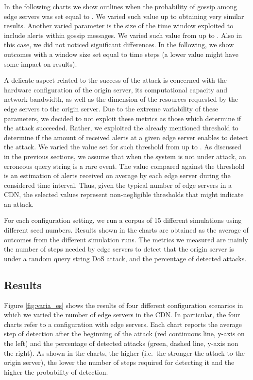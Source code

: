 \documentclass{IEEEtran}
\begin{document}
In the following charts we show outlines when the probability of gossip  among edge servers was set equal to . We varied such value up to  obtaining very similar results.
Another varied parameter is the size of the time window exploited to include alerts within gossip messages. We varied such value from  up to . Also in this case, we did not noticed significant differences. In the following, we show outcomes with a window size set equal to  time steps (a lower value might have some impact on results).

A delicate aspect related to the success of the attack is concerned with the hardware configuration of the origin server, its computational capacity and network bandwidth, as well as the dimension of the resources requested by the edge servers to the origin server. Due to the extreme variability of these parameters, we decided to not exploit these metrics as those which determine if the attack succeeded. Rather, we exploited the already mentioned threshold to determine if the amount of received alerts at a given edge server enables to detect the attack. We varied the value set for such threshold from  up to . 
As discussed in the previous sections, we assume that when the system is not under attack, an erroneous query string is a rare event. The value compared against the threshold is an estimation of alerts received on average by each edge server during the considered time interval. Thus, given the typical number of edge servers  in a CDN, the selected values represent non-negligible thresholds that might indicate an attack.

For each configuration setting, we run a corpus of 15 different simulations using different seed numbers. Results shown in the charts are obtained as the average of outcomes from the different simulation runs. The metrics we measured are mainly the number of steps needed by edge servers to detect that the origin server is under a random query string DoS attack, and the percentage of detected attacks.

\subsection{Results}

Figure \ref{fig:varia_es} shows the results of four different configuration scenarios in which we varied the number of edge servers in the CDN. In particular, the four charts refer to a configuration with  edge servers. Each chart reports the average step of detection after the beginning of the attack (red continuous line, y-axis on the left) and the percentage of detected attacks (green, dashed line, y-axis non the right). As shown in the charts, the higher   (i.e.~the stronger the attack to the origin server), the lower the number of steps required for detecting it and the higher the probability of detection.
\end{document}
